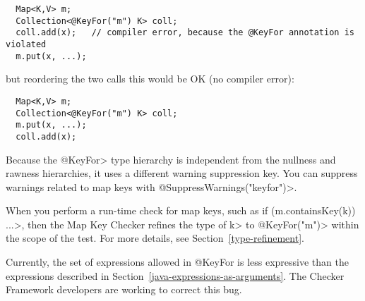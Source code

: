 \begin{Verbatim}
  Map<K,V> m;
  Collection<@KeyFor("m") K> coll;
  coll.add(x);   // compiler error, because the @KeyFor annotation is violated
  m.put(x, ...);
\end{Verbatim}

\noindent
but reordering the two calls this would be OK (no compiler error):

\begin{Verbatim}
  Map<K,V> m;
  Collection<@KeyFor("m") K> coll;
  m.put(x, ...);
  coll.add(x);
\end{Verbatim}


Because the \<@KeyFor> type hierarchy is independent from the nullness and
rawness hierarchies, it uses a different warning suppression key.
You can suppress warnings related to map keys with
\<@SuppressWarnings("keyfor")>.

When you perform a run-time check for map keys, such as \<if (m.containsKey(k))
...>, then the Map Key Checker refines the type of \<k> to
\<@KeyFor("m")> within the scope of the test.  For more details, see
Section~\ref{type-refinement}.

Currently, the set of expressions allowed in @KeyFor is less expressive
than the expressions described in
Section~\ref{java-expressions-as-arguments}.  The Checker Framework
developers are working to correct this bug.


